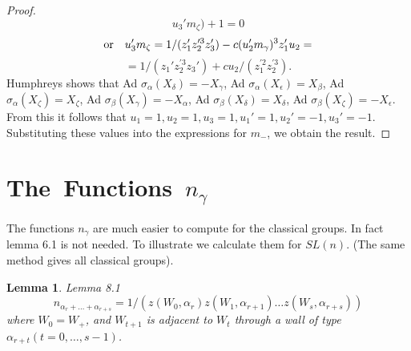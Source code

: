 \documentclass{memo-l}
\newtheorem{lemma}[theorem]{Lemma}
\theoremstyle{definition}
\theoremstyle{remark}
\numberwithin{section}{chapter}
\numberwithin{equation}{chapter}
\begin{document}
\begin{proof}
$$u_{3}'m_{{\zeta}})+1 = 0
$$
$$
\hbox{or}\quad  u_{3}'m_{{\zeta}} = 1/(z_{1}'z_{2}^{\prime3}z_{3}') -
c(u_{2}'m_{{\gamma}})^{3}z_{1}'u_{2} =
$$
$$
= 1/(z_{1}'z_{2}^{\prime3}z_{3}') + cu_{2}/(z_{1}^{\prime2}z_{2}^{\prime3}) .
$$
Humphreys \cite{MR0396773} shows that Ad ${\sigma}_{{\alpha}}(X_{{\delta}}) =
-X_{{\gamma}}$, Ad ${\sigma}_{{\alpha}}(X_{{\epsilon}}) =
X_{{\beta}}$, Ad ${\sigma}_{{\alpha}}(X_{{\zeta}}) =
X_{{\zeta}}$, Ad ${\sigma}_{{\beta}}(X_{{\gamma}}) =
-X_{{\alpha}}$, Ad ${\sigma}_{{\beta}}(X_{{\delta}}) =
X_{{\delta}}$, Ad ${\sigma}_{{\beta}}(X_{{\zeta}}) = -X_{{\epsilon}}$.
 From this it follows that $u_{1}=1, u_{2}=1, u_{3} = 1, u_{1}' =
1, u_{2}'=-1, u_{3}' = -1$.
 Substituting these values into the expressions for $m_{-}$, we obtain the
result.
\end{proof}


\section{The\ Functions\ $n_\gamma$}

   The functions $n_{{\gamma}}$ are much easier to compute for the classical
groups.
 In fact lemma 6.1 is not needed.
To illustrate we calculate them for $SL(n)$.
 (The same method gives all classical groups).

\begin{lemma}{Lemma 8.1}
$$
n_{\alpha_r+\ldots +\alpha_{r+s}}  =
1/(z(W_{0},{\alpha}_{r})z(W_{1},{\alpha}_{r+1})\ldots z(W_{s},{\alpha}_{r+s}))
$$
where $W_{0} = W_{+}$, and $W_{t+1}$ is adjacent to $W_{t}$ through a wall of
type ${\alpha}_{r+t} (t = 0,\ldots ,s-1)$.
\end{lemma}
\end{document}
